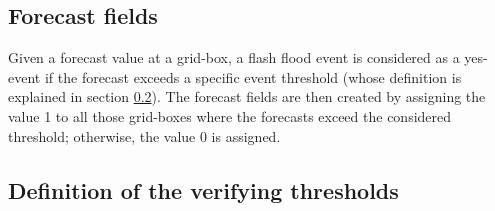 \subsection{Forecast fields}

Given a forecast value at a grid-box, a flash flood event is considered as a yes-event if the forecast exceeds a specific event threshold (whose definition is explained in section \ref{verifying_rainfall_threshold}). The forecast fields are then created by assigning the value 1 to all those grid-boxes where the forecasts exceed the considered threshold; otherwise, the value 0 is assigned. 

\subsection{Definition of the verifying thresholds}
\label{verifying_rainfall_threshold}
